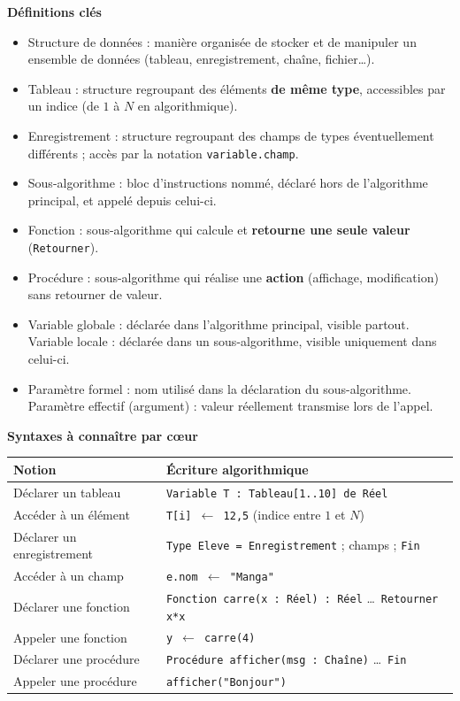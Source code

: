 \documentclass[11pt]{article}
\newcommand{\cle}[1]{{\popxbold\color{popdark}#1}}
\begin{document}
\begin{bilan}
\textbf{Définitions clés}
\begin{itemize}
  \item \cle{Structure de données} : manière organisée de stocker et de manipuler un ensemble de données (tableau, enregistrement, chaîne, fichier\ldots).
  \item \cle{Tableau} : structure regroupant des éléments \textbf{de même type}, accessibles par un \cle{indice} (de $1$ à $N$ en algorithmique).
  \item \cle{Enregistrement} : structure regroupant des \cle{champs} de types éventuellement différents ; accès par la notation \texttt{variable.champ}.
  \item \cle{Sous-algorithme} : bloc d'instructions nommé, déclaré hors de l'algorithme principal, et \cle{appelé} depuis celui-ci.
  \item \cle{Fonction} : sous-algorithme qui calcule et \textbf{retourne une seule valeur} (\texttt{Retourner}).
  \item \cle{Procédure} : sous-algorithme qui réalise une \textbf{action} (affichage, modification) sans retourner de valeur.
  \item \cle{Variable globale} : déclarée dans l'algorithme principal, visible partout. \cle{Variable locale} : déclarée dans un sous-algorithme, visible uniquement dans celui-ci.
  \item \cle{Paramètre formel} : nom utilisé dans la déclaration du sous-algorithme. \cle{Paramètre effectif} (argument) : valeur réellement transmise lors de l'appel.
\end{itemize}

\textbf{Syntaxes à connaître par c\oe ur}
\begin{center}
\begin{tabularx}{\linewidth}{|l|X|}
\hline
\rowcolor{popblueL} \textbf{Notion} & \textbf{Écriture algorithmique} \\
\hline
Déclarer un tableau & \texttt{Variable T : Tableau[1..10] de Réel} \\
\hline
Accéder à un élément & \texttt{T[i] $\leftarrow$ 12,5} \quad (indice entre $1$ et $N$) \\
\hline
Déclarer un enregistrement & \texttt{Type Eleve = Enregistrement} ; champs ; \texttt{Fin} \\
\hline
Accéder à un champ & \texttt{e.nom $\leftarrow$ "Manga"} \\
\hline
Déclarer une fonction & \texttt{Fonction carre(x : Réel) : Réel} \ldots\ \texttt{Retourner x*x} \\
\hline
Appeler une fonction & \texttt{y $\leftarrow$ carre(4)} \\
\hline
Déclarer une procédure & \texttt{Procédure afficher(msg : Chaîne)} \ldots\ \texttt{Fin} \\
\hline
Appeler une procédure & \texttt{afficher("Bonjour")} \\
\hline
\end{tabularx}
\end{center}


\end{bilan}
\end{document}
